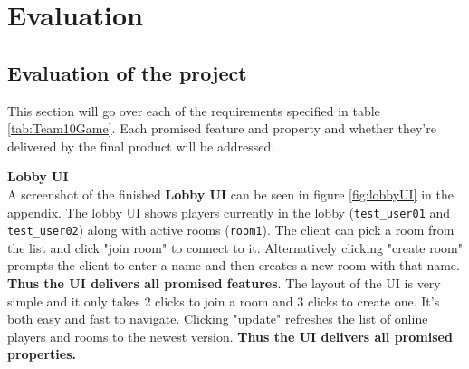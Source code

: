 \chapter{Evaluation}
\section{Evaluation of the project}
% 
% 
% 
% 
% 
This section will go over each of the requirements specified in table \ref{tab:Team10Game}. Each promised feature and property and whether they're delivered by the final product will be addressed. 

\textbf{Lobby UI}\\
A screenshot of the finished \textbf{Lobby UI} can be seen in figure \ref{fig:lobbyUI} in the appendix.
The lobby UI shows players currently in the lobby (\texttt{test\_user01} and \texttt{test\_user02}) along with active rooms (\texttt{room1}). The client can pick a room from the list and click "join room" to connect to it. Alternatively clicking "create room" prompts the client to enter a name and then creates a new room with that name. \textbf{Thus the UI delivers all promised features}. The layout of the UI is very simple and it only takes 2 clicks to join a room and 3 clicks to create one. It's both easy and fast to navigate. Clicking "update" refreshes the list of online players and rooms to the newest version. \textbf{Thus the UI delivers all promised properties.}

